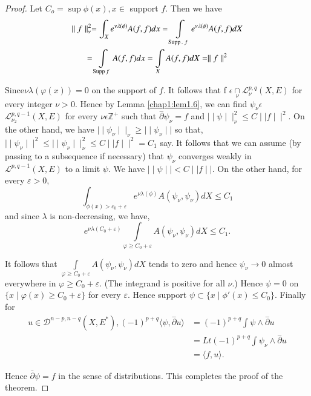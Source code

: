 \begin{proof}
  Let $C_o = \sup \phi (x), x \in$ support $f$.  Then we have 
  \begin{multline*}
  \parallel f \parallel^2_\nu = \int_X e^{\nu \lambda (\phi)} A
  (f,f)dx=  \int\limits_{\operatorname{Supp}.\;f} e^{\nu \lambda(\phi)} 
  A(f,f)dX\\ 
  =\int\limits_{\operatorname{Supp} f}  A(f,f) dx= \int\limits_{X} A(f,f)dX =
  \parallel f \parallel^2
  \end{multline*}

Since\pageoriginale $\nu \lambda (\varphi (x))  =  0 $ on the support
of $f$. It follows  that  f $ \epsilon \underset{\nu}{\cap}
\mathcal{L}^{p,q}_{\nu} (X,E) $ 
 for every integer  $ \nu > 0$. Hence by Lemma \ref{chap1:lem1.6}, we can find
 $\psi_{\nu} \epsilon$  $ \mathcal{L}^{p,q-1}_{\nu{_{2}}}  (X,E)$ 
 for every  $ \nu \epsilon \mathbb{Z}^{+} $ such that
 $\overset{-}{\partial} \psi_{\nu}  = f$ and  $\mid\mid \psi \mid\mid^2_\nu 
 \leq  C \mid\mid f \mid\mid^{2}$.  
  On the other hand, we have  $ \mid\mid \psi_{\nu} \mid\mid_{\nu}
  \ge  \mid\mid  \psi_{\nu} \mid\mid $ so that,  
  $\mid\mid \psi_{\nu} \mid\mid^{2} \leq    \mid\mid \psi_{\nu}
  \mid\mid^{2}_{\nu} \leq C \mid\mid f \mid\mid^{2} = C_{1}$  say. 
  It follows that we can assume  (by passing  to a  subsequence  if
  necessary) that  $\psi_{\nu}$  converges weakly in
  $\mathcal{L}^{p,q-1} (X,E) $ to a limit $\psi$. We have   
  $\mid\mid \psi \mid\mid < C \mid\mid f \mid\mid$. On the other hand,
  for every $\varepsilon  > 0$, 
  $$  
  \int_{\phi(x) > c_{0}+ \varepsilon}  e^{\nu \lambda (\phi)}  { A}
  (\psi_{\nu},\psi_{\nu}) d X \leq C_{1} 
  $$
  and since  $\lambda $ is non-decreasing, we have,
  $$ 
  e^{\nu \lambda (C_{0}+\varepsilon)} \underset{\varphi \ge C_{0}+
    \varepsilon}{\int}  A (\psi_{\nu},\psi_{\nu}) dX \leq C_{1}.
  $$
    
  It follows that $\underset{\varphi \ge C_{0}+\varepsilon}{\int} A
  (\psi_{\nu},\psi_{\nu}) dX$ tends to zero and hence
  $\psi_{\nu}\rightarrow 0 $ 
  almost everywhere in $ \varphi  \ge C_{0}+ \varepsilon$. (The integrand is
  positive for all $\nu$.)  
  Hence $ \psi =0 $ on $\{x \mid \varphi (x) \ge  C_{0} + \varepsilon \} $
  for every  $\varepsilon$. Hence   
  support  $ \psi \subset \{x \mid \phi' (x) \leq C_{0} \} $. Finally for
  \begin{align*}
    u  \in \mathscr{D}^{n-p,n-q} (X,E^*),(-1)^{p+q} \langle \psi,
    \overset{-}{\partial}u \rangle &= (-1)^{p+q}   \int \psi \wedge
    \overset{-}{\partial}u \\  
    &=Lt (-1)^{p+q} \int \psi_{\nu} \wedge \overset{-}{\partial}u\\
    &=\big \langle f,u \big \rangle.
  \end{align*}
     
  Hence $\bar {\partial} \psi =f$ in the sense of distributions. This
  completes the proof of the theorem.  
\end{proof}

